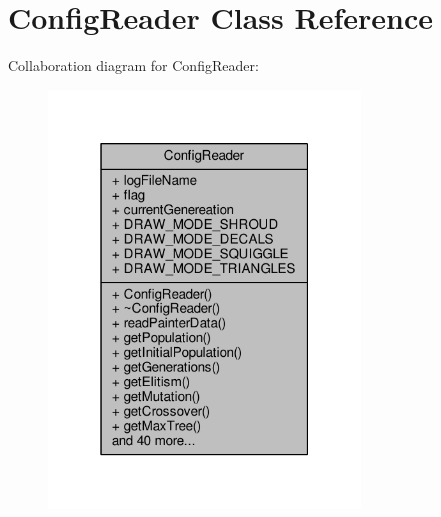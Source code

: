 \hypertarget{classConfigReader}{}\section{Config\+Reader Class Reference}
\label{classConfigReader}


Collaboration diagram for Config\+Reader\+:
\nopagebreak
\begin{figure}[H]
\begin{center}
\leavevmode
\includegraphics[width=235pt]{classConfigReader__coll__graph}
\end{center}
\end{figure}
